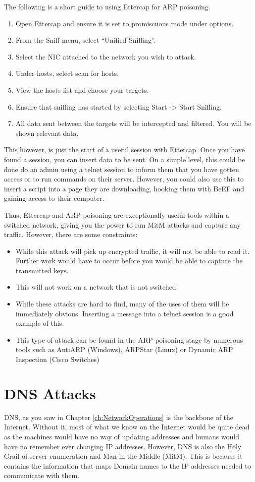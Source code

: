 		The following is a short guide to using Ettercap for ARP poisoning. 
		\begin{enumerate}
			\item Open Ettercap and ensure  it is set to promiscuous mode under options. 
			\item From the Sniff menu, select ``Unified Sniffing''. 
			\item Select the NIC attached to the network you wish to attack. 
			\item Under hosts, select scan for hosts. 
			\item View the hosts list and choose your targets. 
			\item Ensure that sniffing has started by selecting Start -> Start Sniffing. 
			\item All data sent between the targets will be intercepted and filtered. 
				You will be shown relevant data. 
		\end{enumerate}
		This however, is just the start of a useful session with Ettercap. 
		Once you have found a session, you can insert data to be sent. 
		On a simple level, this could be done do an admin using a telnet session to inform them that you have gotten access or to run commands on their server. 
		However, you could also use this to insert a script into a page they are downloading, hooking them with BeEF and gaining access to their computer. 

		Thus, Ettercap and ARP poisoning are exceptionally useful tools within a switched network, 
		giving you the power to run MitM attacks and capture any traffic. 
		However, there are some constraints:
		\begin{itemize}
			\item While this attack will pick up encrypted traffic, it will not be able to read it. 
				Further work would have to occur before you would be able to capture the transmitted keys. 
			\item This will not work on a network that is not switched. 
			\item While these attacks are hard to find, many of the uses of them will be immediately obvious. 
				Inserting a message into a telnet session is a good example of this. 
			\item This type of attack can be found in the ARP poisoning stage by numerous tools such as 
				AntiARP (Windows), ARPStar (Linux) or Dynamic ARP Inspection (Cisco Switches)
		\end{itemize}
	\section{DNS Attacks}
		DNS, as you saw in Chapter \ref{ch:NetworkOperations} is the backbone of the Internet. 
		Without it, most of what we know on the Internet would be quite dead as the machines would have no way of updating addresses and humans would have no remember ever changing IP addresses. 
		However, DNS is also the Holy Grail of server enumeration and Man-in-the-Middle (MitM).
		This is because it contains the information that maps Domain names to the IP addresses needed to communicate with them. 

